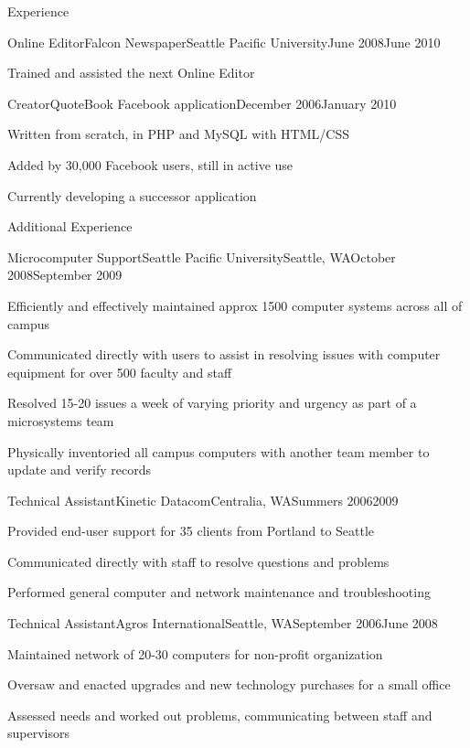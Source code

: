 \documentclass[letterpaper,10pt]{article}
\newcommand{\optarg}[2][]{%
  \ifthenelse{\isempty{#1}}%
    {}%
    {#2}%
}
\newenvironment{res_section}[1]{%
  \vskip 6pt
  \noindent
  {\Large \textbf{#1}}\\
  \rule[8pt]{\textwidth}{0.5pt}
  \vskip -8pt
}{
}
\newenvironment{res_subsection}[1]{%
  \vskip 4pt
  \noindent
  \textbf{\large{#1}}
  \begin{itemize}
}{
  \end{itemize}
}
\newenvironment{res_experienceitem}[5]{%
  \begin{res_subsection}{#1 - \em{%
  #2%
  \optarg[#3]{, #3}%
  \optarg[#4]{, #4}%
  \optarg[#5]{ -- #5}%
  }}
}{
  \end{res_subsection}
}
\begin{document}
\begin{res_section}{Experience}
\begin{res_experienceitem}{Online Editor}{Falcon Newspaper}{Seattle Pacific University}{June 2008}{June 2010}
  \item Trained and assisted the next Online Editor
\end{res_experienceitem}
\begin{res_experienceitem}{Creator}{QuoteBook Facebook application}{}{December 2006}{January 2010}
  \item Written from scratch, in PHP and MySQL with HTML/CSS
  \item Added by 30,000 Facebook users, still in active use
  \item Currently developing a successor application
\end{res_experienceitem}
\end{res_section}
\begin{res_section}{Additional Experience}
\begin{res_experienceitem}{Microcomputer Support}{Seattle Pacific University}{Seattle, WA}{October 2008}{September 2009}
  \item Efficiently and effectively maintained approx 1500 computer systems across all of campus
  \item Communicated directly with users to assist in resolving issues with computer equipment for over 500 faculty and staff
  \item Resolved 15-20 issues a week of varying priority and urgency as part of a microsystems team
  \item Physically inventoried all campus computers with another team member to update and verify records
\end{res_experienceitem}
\begin{res_experienceitem}{Technical Assistant}{Kinetic Datacom}{Centralia, WA}{Summers 2006}{2009}
  \item Provided end-user support for 35 clients from Portland to Seattle
  \item Communicated directly with staff to resolve questions and problems
  \item Performed general computer and network maintenance and troubleshooting
\end{res_experienceitem}
\begin{res_experienceitem}{Technical Assistant}{Agros International}{Seattle, WA}{September 2006}{June 2008}
  \item Maintained network of 20-30 computers for non-profit organization
  \item Oversaw and enacted upgrades and new technology purchases for a small office
  \item Assessed needs and worked out problems, communicating between staff and supervisors

\end{res_experienceitem}
\end{res_section}
\end{document}
